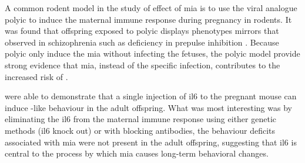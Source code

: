 \documentclass[12pt]{scrbook}
\newcommand*{\glng}{\glsentrylong}
\begin{document}
	A common rodent model in the study of effect of \gls{mia} is to use the viral analogue \gls{polyic} to induce the maternal immune response during pregnancy in rodents.
	It was found that offspring exposed to \gls{polyic} displays phenotypes mirrors that observed in schizophrenia \citep{Li2009c,Meyer2009b,Li2010a} such as deficiency in prepulse inhibition \citep{Cadenhead2000}.
	Because \gls{polyic} only induce the \gls{mia} without infecting the fetuses, the \gls{polyic} model provide strong evidence that \gls{mia}, instead of the specific infection, contributes to the increased risk of \glng{scz}.	
	
	\citet{Smith2007} were able to demonstrate that a single injection of \gls{il6} to the pregnant mouse can induce \glng{scz}-like behaviour in the adult offspring. 
	What was most interesting was by eliminating the \gls{il6} from the maternal immune response using either genetic methods (\gls{il6} knock out) or with blocking antibodies, the behaviour deficits associated with \gls{mia} were not present in the adult offspring, suggesting that \gls{il6} is central to the process by which \gls{mia} causes long-term behavioral changes.
	
\end{document}
